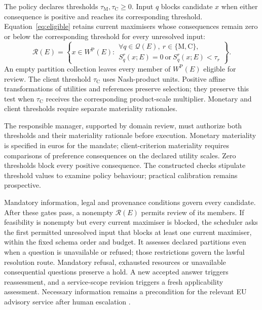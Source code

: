 \documentclass[oneside,10pt,english]{swissi}
\begin{document}
The policy declares thresholds $\tau_{\mathrm M},\tau_{\mathrm C}\ge0$. Input $q$ blocks candidate $x$ when either consequence is positive and reaches its corresponding threshold. Equation~\eqref{eq:eligible} retains current maximisers whose consequences remain zero or below the corresponding threshold for every unresolved input:
\begin{equation}
 \mathcal R(E)=\left\{x\in W^{\mathrm P}(E):
 \begin{array}{l}
 \forall q\in\mathcal Q(E),\ r\in\{\mathrm M,\mathrm C\},\\
 S_q^r(x;E)=0\ \text{or}\ S_q^r(x;E)<\tau_r
 \end{array}\right\}.
 \label{eq:eligible}
\end{equation}
An empty partition collection leaves every member of $W^{\mathrm P}(E)$ eligible for review. The client threshold $\tau_{\mathrm C}$ uses Nash-product units. Positive affine transformations of utilities and references preserve selection; they preserve this test when $\tau_{\mathrm C}$ receives the corresponding product-scale multiplier. Monetary and client thresholds require separate materiality rationales.

The responsible manager, supported by domain review, must authorize both thresholds and their materiality rationale before execution. Monetary materiality is specified in euros for the mandate; client-criterion materiality requires comparisons of preference consequences on the declared utility scales. Zero thresholds block every positive consequence. The constructed checks stipulate threshold values to examine policy behaviour; practical calibration remains prospective.

Mandatory information, legal and provenance conditions govern every candidate. After these gates pass, a nonempty $\mathcal R(E)$ permits review of its members. If feasibility is nonempty but every current maximiser is blocked, the scheduler asks the first permitted unresolved input that blocks at least one current maximiser, within the fixed schema order and budget. It assesses declared partitions even when a question is unavailable or refused; those restrictions govern the lawful resolution route. Mandatory refusal, exhausted resources or unavailable consequential questions preserve a hold. A new accepted answer triggers reassessment, and a service-scope revision triggers a fresh applicability assessment. Necessary information remains a precondition for the relevant EU advisory service after human escalation \parencite{esma1762missinginfo}.
\end{document}

